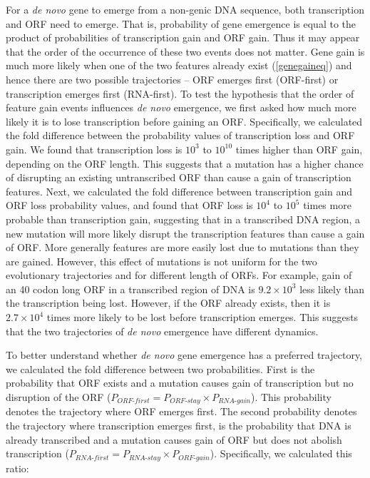\documentclass[12pt,a4paper]{article}
\begin{document}
For a \textit{de novo} gene to emerge from a non-genic DNA sequence, both transcription and ORF need to emerge. That is, probability of gene emergence is equal to the product of probabilities of transcription gain and ORF gain. Thus it may appear that the order of the occurrence of these two events does not matter. Gene gain is much more likely when one of the two features already exist (\autoref{genegaineq}) and hence there are two possible trajectories -- ORF emerges first (ORF-first) or transcription emerges first (RNA-first). To test the hypothesis that the order of feature gain events influences \textit{de novo} emergence, we first asked how much more likely it is to lose transcription before gaining an ORF. Specifically, we calculated the fold difference between the probability values of transcription loss and ORF gain. We found that transcription loss is $10^3$ to $10^{10}$ times higher than ORF gain, depending on the ORF length. This suggests that a mutation has a higher chance of disrupting an existing untranscribed ORF than cause a gain of transcription features. Next, we calculated the fold difference between transcription gain and ORF loss probability values, and found that ORF loss is $10^4$ to $10^5$ times more probable than transcription gain, suggesting that in a transcribed DNA region, a new mutation will more likely disrupt the transcription features than cause a gain of ORF. More generally features are more easily lost due to mutations than they are gained. However, this effect of mutations is not uniform for the two evolutionary trajectories and for different length of ORFs. For example, gain of an 40 codon long ORF in a transcribed region of DNA is $9.2\times10^3$ less likely than the transcription being lost. However, if the ORF already exists, then it is $2.7\times10^4$ times more likely to be lost before transcription emerges. This suggests that the two trajectories of \textit{de novo} emergence have different dynamics.

To better understand whether \textit{de novo} gene emergence has a preferred trajectory, we calculated the fold difference between two probabilities. First is the probability that ORF exists and a mutation causes gain of transcription but no disruption of the ORF ($P_\textit{ORF-first} = P_\textit{ORF-stay}\times P_\textit{RNA-gain}$). This probability denotes the trajectory where ORF emerges first. The second probability denotes the trajectory where transcription emerges first, is the probability that DNA is already transcribed and a mutation causes gain of ORF but does not abolish transcription ($P_\textit{RNA-first} = P_\textit{RNA-stay}\times P_\textit{ORF-gain}$). Specifically, we calculated this ratio:
\end{document}
